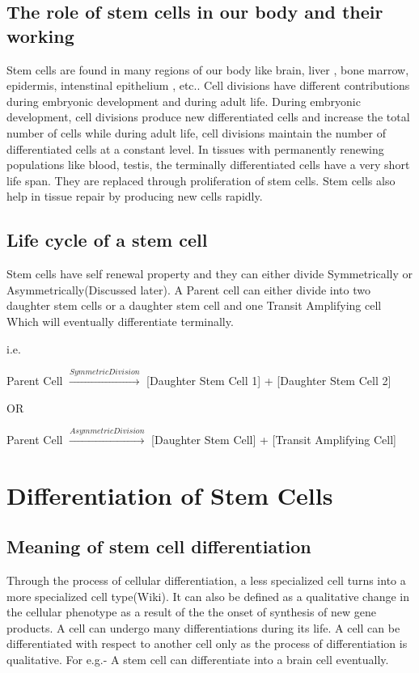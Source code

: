 \documentclass[11pt]{report}
\begin{document}
 \section{\color{red}The role of stem cells in our body and their working}
 Stem cells are found in many regions of our body like brain, liver \cite{Watt2000}, bone marrow, epidermis, intenstinal epithelium \cite{hall1989stem}, etc..
 Cell divisions have different contributions during embryonic development and during adult life. During embryonic development, cell
 divisions produce new differentiated cells and increase the total number of cells while during adult life, cell divisions maintain the number of differentiated cells
 at a constant level. In tissues with permanently renewing populations like blood, testis, the terminally differentiated cells have
 a very short life span. They are replaced through proliferation of stem cells\cite{hall1989stem}. Stem cells also help in tissue repair by producing
 new cells rapidly.

 \section{\color{red}Life cycle of a stem cell}
 Stem cells have self renewal property and they can either divide Symmetrically or Asymmetrically(Discussed later). A Parent cell
 can either divide into two daughter stem cells or a daughter stem cell and one Transit Amplifying cell Which will eventually differentiate
 terminally.
 
 i.e. 
 
  Parent Cell $\xrightarrow{Symmetric Division}$ [Daughter Stem Cell 1] + [Daughter Stem Cell 2]
  
  \begin{center}
    OR
  \end{center}

  Parent Cell $\xrightarrow{Asymmetric Division}$ [Daughter Stem Cell] + [Transit Amplifying Cell]
  
  \chapter{Differentiation of Stem Cells}
  
  \section{\color{red}Meaning of stem cell differentiation}
  Through the process of cellular differentiation, a less specialized cell turns into a more specialized cell type(Wiki). It can also
  be defined as a qualitative change in the cellular phenotype as a result of the the onset of synthesis of new gene products. A
  cell  can undergo many differentiations during its life. A cell can be differentiated with respect to another cell only as the
  process of differentiation is qualitative\cite{hall1989stem}. For e.g.- A stem cell can differentiate into a brain cell eventually.
  
\end{document}
